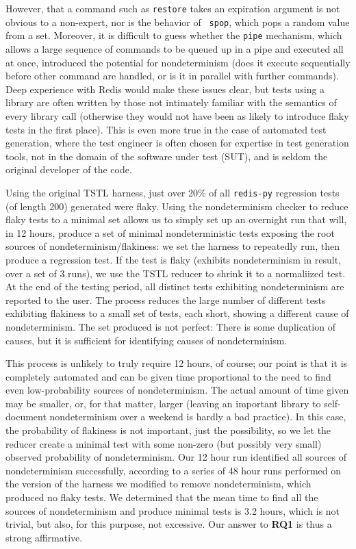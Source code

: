 However, that a command such as {\tt restore} takes an expiration
argument is not obvious to a non-expert, nor is the behavior of {\tt
  spop}, which pops a random value from a set.  Moreover, it is
difficult to guess whether the {\tt pipe} mechanism, which allows a
large sequence of commands to be queued up in a pipe and executed all
at once, introduced the potential for nondeterminism (does it execute
sequentially before other command are handled, or is it in parallel
with further commands).  Deep experience with Redis would make these
issues clear, but tests using a library are often written by those not
intimately familiar with the semantics of every library call (otherwise they would not have
been as likely to introduce flaky tests in the first place).  This is
even more true in the case of automated test generation, where the
test engineer is often chosen for expertise in test generation tools,
not in the domain of the software under test (SUT), and is seldom the
original developer of the code.

Using the original TSTL harness, just over 20\% of all {\tt redis-py}
regression tests (of length 200) generated were flaky.  Using the
nondeterminism checker to reduce flaky tests to a minimal set allows
us to simply set up an overnight run that will, in 12 hours, produce
a set of minimal nondeterministic tests exposing the root sources of
nondeterminism/flakiness: we set the harness to repeatedly run, then
produce a regression test.  If the test is flaky (exhibits
nondeterminism in result, over a set of 3 runs), we use the TSTL reducer to shrink it to a
normaliized \cite{onetest} test.  At the end of the testing period,
all distinct tests exhibiting nondeterminism are reported to the
user.  The process reduces the large number of different tests
exhibiting flakiness to a small set of tests, each short, showing a
different cause of nondeterminism.  The set produced is not perfect:
There is some duplication of causes, but it is sufficient for
identifying causes of nondeterminism.

This process is unlikely to truly require 12
hours, of course; our point is that it is completely automated and
can be given time proportional to the need to find even
low-probability sources of nondeterminism.  The actual amount of time given
may be smaller, or, for that matter, larger (leaving an important
library to self-document nondeterminism over a weekend is hardly a bad
practice).  In this case, the probability of flakiness
is not important, just the possibility, so we let the reducer
create a minimal test with some non-zero (but possibly very small)
observed probability of nondeterminism.  Our 12 hour run identified
all sources of nondeterminism successfully, according to a series of
48 hour runs performed on the version of the harness we modified to
remove nondeterminism, which produced no flaky tests.  We determined that the mean time to find all
the sources of nondeterminism and produce minimal tests is 3.2
hours, which is not trivial, but also, for this purpose, not
excessive.  Our answer to {\bf RQ1} is thus a strong affirmative.


